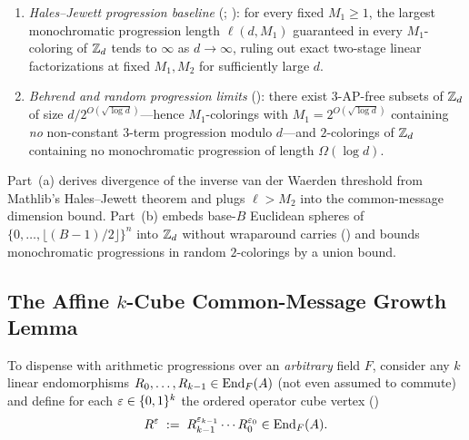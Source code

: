 \begin{proposition}\label{prop:diag-hj-behrend}
\begin{enumerate}[label=(\alph*)]
\item \emph{Hales--Jewett progression baseline}
  (\cite{HalesJewett1963}; \cite[Section~6]{SharedDecoders2026}): for every fixed $M_1 \ge 1$, the
  largest monochromatic progression length $\ell(d, M_1)$ guaranteed in every $M_1$-coloring of
  $\mathbb{Z}_d$ tends to $\infty$ as $d \to \infty$, ruling out exact two-stage linear factorizations at
  fixed $M_1, M_2$ for sufficiently large $d$.
\item \emph{Behrend and random progression limits} (\cite{Behrend1946}): there exist $3$-AP-free
  subsets of $\mathbb{Z}_d$ of size $d / 2^{O(\sqrt{\log d})}$---hence $M_1$-colorings with
  $M_1 = 2^{O(\sqrt{\log d})}$ containing \emph{no} non-constant $3$-term progression modulo
  $d$---and $2$-colorings of $\mathbb{Z}_d$ containing no monochromatic progression of length
  $\Omega(\log d)$.
\end{enumerate}
\end{proposition}
\begin{outline}
Part~(a) derives divergence of the inverse van der Waerden threshold from Mathlib's Hales--Jewett
theorem and plugs $\ell > M_2$ into the common-message dimension bound. Part~(b) embeds base-$B$
Euclidean spheres of $\{0,\dots,\lfloor(B-1)/2\rfloor\}^n$ into $\mathbb{Z}_d$ without wraparound carries
(\cite{Behrend1946}) and bounds monochromatic progressions in random $2$-colorings by a union bound.
\end{outline}

\subsection{The Affine \texorpdfstring{$k$}{k}-Cube Common-Message Growth Lemma}\label{sec:cube-lemma}

To dispense with arithmetic progressions over an \emph{arbitrary} field $F$, consider any $k$
linear endomorphisms $R_0, \dots, R_{k-1} \in \operatorname{End}_F(A)$ (not even assumed to commute) and define
for each $\varepsilon \in \{0,1\}^k$ the ordered operator cube vertex ()
\[
  R^\varepsilon \;:=\; R_{k-1}^{\varepsilon_{k-1}} \cdots R_0^{\varepsilon_0} \in \operatorname{End}_F(A).
\]

